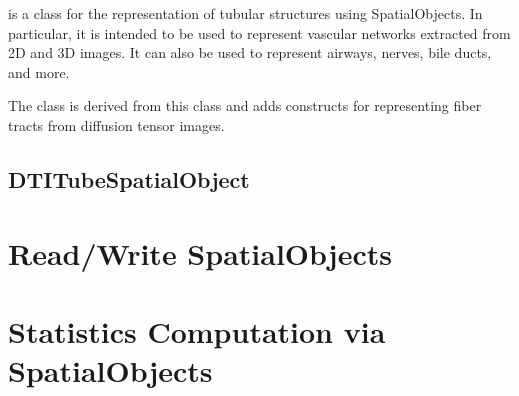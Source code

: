  is a class for the representation
of tubular structures using SpatialObjects.  In particular, it is intended
to be used to represent vascular networks extracted from 2D and 3D images. 
It can also be used to represent airways, nerves, bile ducts, and more.

 The class  is derived from this class
and adds constructs for representing fiber tracts from diffusion tensor images.

\label{sec:TubeSpatialObject}



\subsection{DTITubeSpatialObject}
\label{sec:DTITubeSpatialObject}



\section{Read/Write SpatialObjects}
\label{sec:ReadWriteSpatialObjects}



\section{Statistics Computation via SpatialObjects}
\label{sec:SpatialObjectToImageStatisticsCalculator}

